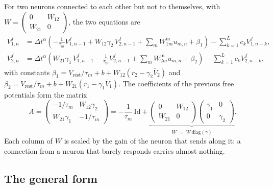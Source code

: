 \documentclass[11pt,a4paper]{article}
\newcommand{\Wt}{\tilde W}
\newcommand{\Vrest}{V_{\mathrm{rest}}}
\begin{document}
For two neurons connected to each other but not to themselves, with $W = \left(\begin{smallmatrix} 0 & W_{12} \\ W_{21} & 0 \end{smallmatrix}\right)$, the two equations are
\begin{align*}
V^f_{1,n} &= \Delta t^{\alpha}\left( -\tfrac{1}{\tau_m} V^f_{1,n-1} + W_{12}\gamma_2\, V^f_{2,n-1} + \textstyle\sum_m W^{\mathrm{in}}_{1m} u_{m,n} + \beta_1 \right) - \textstyle\sum_{k=1}^{L} c_k V^f_{1,n-k}, \\
V^f_{2,n} &= \Delta t^{\alpha}\left( W_{21}\gamma_1\, V^f_{1,n-1} - \tfrac{1}{\tau_m} V^f_{2,n-1} + \textstyle\sum_m W^{\mathrm{in}}_{2m} u_{m,n} + \beta_2 \right) - \textstyle\sum_{k=1}^{L} c_k V^f_{2,n-k},
\end{align*}
with constants $\beta_1 = \Vrest/\tau_m + b + W_{12}(r_2 - \gamma_2 \bar V_2)$ and $\beta_2 = \Vrest/\tau_m + b + W_{21}(r_1 - \gamma_1 \bar V_1)$. The coefficients of the previous free potentials form the matrix
\begin{equation*}
A = \begin{pmatrix} -1/\tau_m & W_{12}\gamma_2 \\ W_{21}\gamma_1 & -1/\tau_m \end{pmatrix}
= -\frac{1}{\tau_m}\,\mathrm{Id} + \underbrace{\begin{pmatrix} 0 & W_{12} \\ W_{21} & 0 \end{pmatrix}\begin{pmatrix} \gamma_1 & 0 \\ 0 & \gamma_2 \end{pmatrix}}_{\Wt \;=\; W\,\mathrm{diag}(\gamma)}.
\end{equation*}
Each column of $W$ is scaled by the gain of the neuron that sends along it: a connection from a neuron that barely responds carries almost nothing.

\subsection{The general form}
\end{document}
